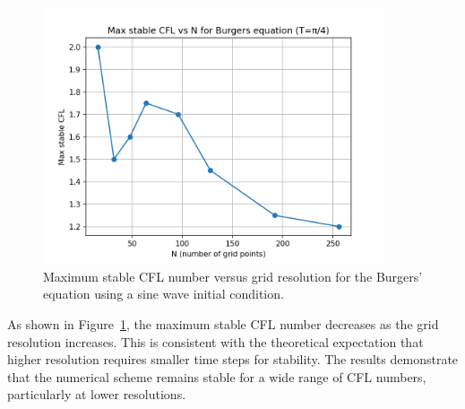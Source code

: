 \documentclass{article}
\begin{document}
\begin{figure}[htbp]
    \centering
    \includegraphics[width=0.9\textwidth]{figure/burgers_cfl_stability.png}
    \caption{Maximum stable CFL number versus grid resolution for the Burgers' equation using a sine wave initial condition.}
    \label{fig:burgers_cfl_stability}
\end{figure}

As shown in Figure~\ref{fig:burgers_cfl_stability}, the maximum stable CFL number decreases as the grid resolution increases. This is consistent with the theoretical expectation that higher resolution requires smaller time steps for stability. The results demonstrate that the numerical scheme remains stable for a wide range of CFL numbers, particularly at lower resolutions.
\end{document}
